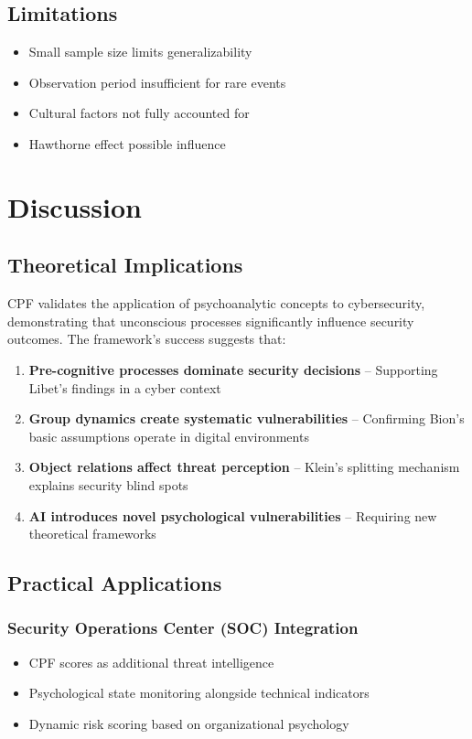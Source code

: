 \documentclass[11pt,a4paper]{article}
\begin{document}
\subsection{Limitations}

\begin{itemize}
\item Small sample size limits generalizability
\item Observation period insufficient for rare events
\item Cultural factors not fully accounted for
\item Hawthorne effect possible influence
\end{itemize}

\section{Discussion}

\subsection{Theoretical Implications}

CPF validates the application of psychoanalytic concepts to cybersecurity, demonstrating that unconscious processes significantly influence security outcomes. The framework's success suggests that:

\begin{enumerate}
\item \textbf{Pre-cognitive processes dominate security decisions} -- Supporting Libet's findings in a cyber context
\item \textbf{Group dynamics create systematic vulnerabilities} -- Confirming Bion's basic assumptions operate in digital environments
\item \textbf{Object relations affect threat perception} -- Klein's splitting mechanism explains security blind spots
\item \textbf{AI introduces novel psychological vulnerabilities} -- Requiring new theoretical frameworks
\end{enumerate}

\subsection{Practical Applications}

\subsubsection{Security Operations Center (SOC) Integration}
\begin{itemize}
\item CPF scores as additional threat intelligence
\item Psychological state monitoring alongside technical indicators
\item Dynamic risk scoring based on organizational psychology
\end{itemize}
\end{document}
